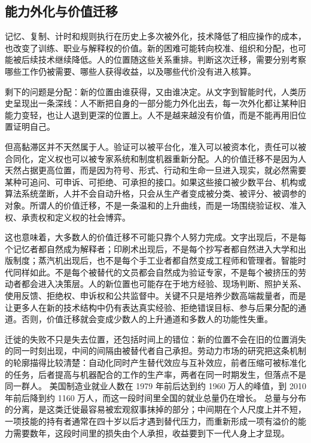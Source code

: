 \subsection{能力外化与价值迁移}


记忆、复制、计时和规则执行在历史上多次被外化，技术降低了相应操作的成本，也改变了训练、职业与解释权的价值。新的困难可能转向校准、组织和分配，也可能被后续技术继续降低。人的位置随这些关系重排。判断这次迁移，需要分别考察哪些工作仍被需要、哪些人获得收益，以及哪些代价没有进入核算。

剩下的问题是分配：新的位置由谁获得，又由谁决定。从文字到智能时代，人类历史呈现出一条深线：人不断把自身的一部分能力外化出去，每一次外化都让某种旧能力变轻，也让人退到更深的位置上。人不是越来越没有价值，而是不能再用旧位置证明自己。

但高黏滞区并不天然属于人。验证可以被平台化，准入可以被资本化，责任可以被合同化，定义权也可以被专家系统和制度机器重新分配。人的价值迁移不是因为人天然占据更高位置，而是因为符号、形式、行动和生命一旦进入现实，就必然需要某种可追问、可申诉、可拒绝、可承担的接口。如果这些接口被少数平台、机构或算法系统垄断，人并不会自动升格，只会从生产者变成被分类、被评分、被调参的对象。所谓人的价值迁移，不是一条温和的上升曲线，而是一场围绕验证权、准入权、承责权和定义权的社会博弈。

这也意味着，大多数人的价值迁移不可能只靠个人努力完成。文字出现后，不是每个记忆者都自然成为解释者；印刷术出现后，不是每个抄写者都自然进入大学和出版制度；蒸汽机出现后，也不是每个手工业者都自然变成工程师和管理者。智能时代同样如此。不是每个被替代的文员都会自然成为验证专家，不是每个被挤压的劳动者都会进入决策层。人的新位置也可能存在于地方经验、现场判断、照护关系、使用反馈、拒绝权、申诉权和公共监督中。关键不只是培养少数高端裁量者，而是让更多人在新的技术结构中仍有表达真实经验、拒绝错误目标、参与后果分配的通道。否则，价值迁移就会变成少数人的上升通道和多数人的功能性失重。

迁徙的失败不只是失去位置，还包括时间上的错位：新的位置不会在旧的位置消失的同一时刻出现，中间的间隔由被替代者自己承担。劳动力市场的研究把这条机制的轮廓描得比较清楚：自动化同时产生替代效应与互补效应，前者压缩可被标准化的任务，后者提高与机器配合的工作的生产率，两者在同一时期发生，但落点不是同一群人。\cite{autor2015why} 美国制造业就业人数在 1979 年前后达到约 1960 万人的峰值，到 2010 年前后降到约 1160 万人，而这一段时间里全国的就业总量仍在增长。\cite{bls2024employment} 总量与分布的分离，是这类迁徙最容易被宏观叙事抹掉的部分；中间期在个人尺度上并不短，一项技能的持有者通常在四十岁以后才遇到替代压力，而重新形成一项有溢价的能力需要数年，这段时间里的损失由个人承担，收益要到下一代人身上才显现。

